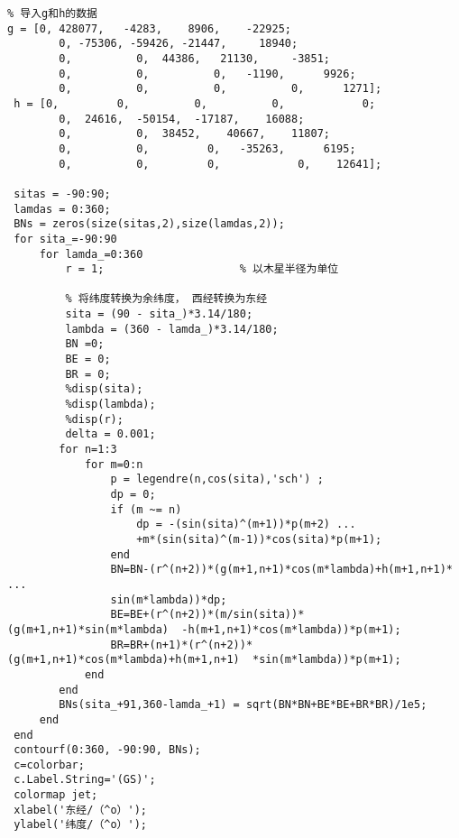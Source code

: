 \documentclass{article}
\begin{document}
\begin{lstlisting}
% 导入g和h的数据
g = [0, 428077,   -4283,    8906,    -22925;
        0, -75306, -59426, -21447,     18940;
        0,          0,  44386,   21130,     -3851;
        0,          0,          0,   -1190,      9926;
        0,          0,          0,          0,      1271];
 h = [0,         0,          0,          0,            0;
        0,  24616,  -50154,  -17187,    16088;
        0,          0,  38452,    40667,    11807;
        0,          0,         0,   -35263,      6195;
        0,          0,         0,            0,    12641];
   
 sitas = -90:90;
 lamdas = 0:360;
 BNs = zeros(size(sitas,2),size(lamdas,2));
 for sita_=-90:90
     for lamda_=0:360
         r = 1;                     % 以木星半径为单位
 
         % 将纬度转换为余纬度， 西经转换为东经
         sita = (90 - sita_)*3.14/180;
         lambda = (360 - lamda_)*3.14/180;
         BN =0;
         BE = 0;
         BR = 0;
         %disp(sita);
         %disp(lambda);
         %disp(r);
         delta = 0.001;
        for n=1:3
            for m=0:n
                p = legendre(n,cos(sita),'sch') ;
                dp = 0;
                if (m ~= n)
                    dp = -(sin(sita)^(m+1))*p(m+2) ... 
                    +m*(sin(sita)^(m-1))*cos(sita)*p(m+1);
                end
                BN=BN-(r^(n+2))*(g(m+1,n+1)*cos(m*lambda)+h(m+1,n+1)* ... 
                sin(m*lambda))*dp;
                BE=BE+(r^(n+2))*(m/sin(sita))*(g(m+1,n+1)*sin(m*lambda)  -h(m+1,n+1)*cos(m*lambda))*p(m+1);
                BR=BR+(n+1)*(r^(n+2))*(g(m+1,n+1)*cos(m*lambda)+h(m+1,n+1)  *sin(m*lambda))*p(m+1);
            end
        end
        BNs(sita_+91,360-lamda_+1) = sqrt(BN*BN+BE*BE+BR*BR)/1e5;
     end
 end
 contourf(0:360, -90:90, BNs);
 c=colorbar;
 c.Label.String='(GS)';
 colormap jet;
 xlabel('东经/（^o）');
 ylabel('纬度/（^o）');

\end{lstlisting}
\end{document}

